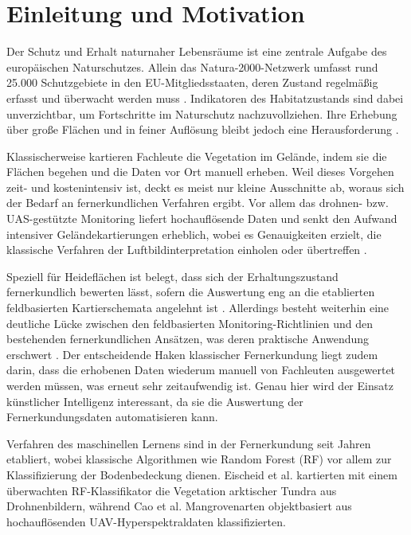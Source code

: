 \section{Einleitung und Motivation}\label{einleitung}

Der Schutz und Erhalt naturnaher Lebensräume ist eine zentrale Aufgabe des europäischen Naturschutzes. Allein das Natura-2000-Netzwerk umfasst rund 25.000 Schutzgebiete in den EU-Mitgliedsstaaten, deren Zustand regelmäßig erfasst und überwacht werden muss \cite{Kissling.2024}. Indikatoren des Habitatzustands sind dabei unverzichtbar, um Fortschritte im Naturschutz nachzuvollziehen. Ihre Erhebung über große Flächen und in feiner Auflösung bleibt jedoch eine Herausforderung \cite{Kissling.2024}.

Klassischerweise kartieren Fachleute die Vegetation im Gelände, indem sie die Flächen begehen und die Daten vor Ort manuell erheben. Weil dieses Vorgehen zeit- und kostenintensiv ist, deckt es meist nur kleine Ausschnitte ab, woraus sich der Bedarf an fernerkundlichen Verfahren ergibt. Vor allem das drohnen- bzw. UAS-gestützte Monitoring liefert hochauflösende Daten und senkt den Aufwand intensiver Geländekartierungen erheblich, wobei es Genauigkeiten erzielt, die klassische Verfahren der Luftbildinterpretation einholen oder übertreffen \cite{Goncalves.2016}.

Speziell für Heideflächen ist belegt, dass sich der Erhaltungszustand fernerkundlich bewerten lässt, sofern die Auswertung eng an die etablierten feldbasierten Kartierschemata angelehnt ist \cite{Schmidt.2017}. Allerdings besteht weiterhin eine deutliche Lücke zwischen den feldbasierten Monitoring-Richtlinien und den bestehenden fernerkundlichen Ansätzen, was deren praktische Anwendung erschwert \cite{Schmidt.2017}. Der entscheidende Haken klassischer Fernerkundung liegt zudem darin, dass die erhobenen Daten wiederum manuell von Fachleuten ausgewertet werden müssen, was erneut sehr zeitaufwendig ist. Genau hier wird der Einsatz künstlicher Intelligenz interessant, da sie die Auswertung der Fernerkundungsdaten automatisieren kann.

Verfahren des maschinellen Lernens sind in der Fernerkundung seit Jahren etabliert, wobei klassische Algorithmen wie Random Forest (RF) vor allem zur Klassifizierung der Bodenbedeckung dienen. Eischeid et al. \cite{Eischeid.2021} kartierten mit einem überwachten RF-Klassifikator die Vegetation arktischer Tundra aus Drohnenbildern, während Cao et al. \cite{Cao.2018} Mangrovenarten objektbasiert aus hochauflösenden UAV-Hyperspektraldaten klassifizierten.

